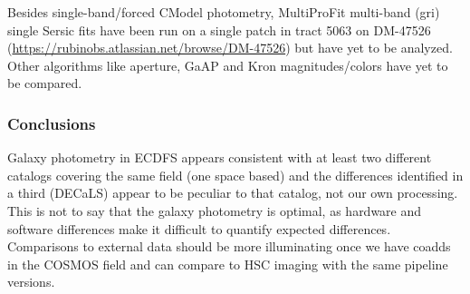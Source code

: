 Besides single-band/forced CModel photometry, MultiProFit multi-band (gri) single Sersic fits have been run on a single patch in tract 5063 on DM-47526 (\url{https://rubinobs.atlassian.net/browse/DM-47526}) but have yet to be analyzed.
Other algorithms like aperture, GaAP and Kron magnitudes/colors have yet to be compared.

\subsubsection{Conclusions}
\label{subsec:galaxy_photometry_conclusions}

Galaxy photometry in ECDFS appears consistent with at least two different catalogs covering the same field (one space based) and the differences identified in a third (DECaLS) appear to be peculiar to that catalog, not our own processing.
This is not to say that the galaxy photometry is optimal, as hardware and software differences make it difficult to quantify expected differences.
Comparisons to external data should be more illuminating once we have coadds in the COSMOS field and can compare to HSC imaging with the same pipeline versions.

